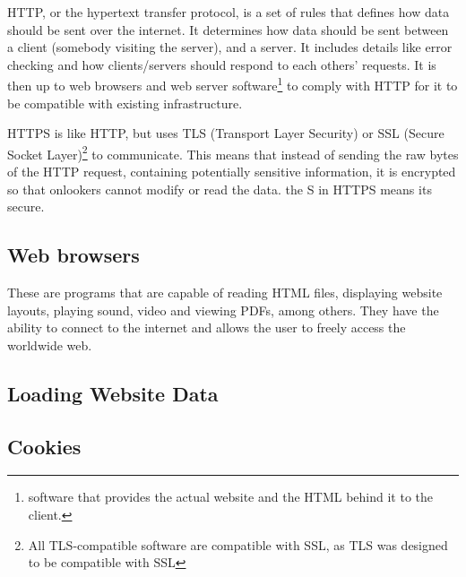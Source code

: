 \documentclass[../main.tex]{subfiles}
\begin{document}
HTTP, or the hypertext transfer protocol, is a set of rules that defines how data should be sent over the internet. It determines how data should be sent between a client (somebody visiting the server), and a server. It includes details like error checking and how clients/servers should respond to each others' requests. It is then up to web browsers and web server software\footnote{software that provides the actual website and the HTML behind it to the client.} to comply with HTTP for it to be compatible with existing infrastructure.

HTTPS is like HTTP, but uses TLS (Transport Layer Security) or SSL (Secure Socket Layer)\footnote{All TLS-compatible software are compatible with SSL, as TLS was designed to be compatible with SSL} to communicate. This means that instead of sending the raw bytes of the HTTP request, containing potentially sensitive information, it is encrypted so that onlookers cannot modify or read the data. the S in HTTPS means its secure.

\subsection{Web browsers}

These are programs that are capable of reading HTML files, displaying website layouts, playing sound, video and viewing PDFs, among others. They have the ability to connect to the internet and allows the user to freely access the worldwide web.

\subsection{Loading Website Data}

\subsection{Cookies}
\end{document}
